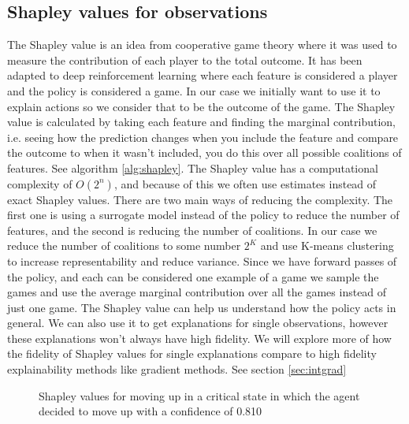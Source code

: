 \documentclass[UKenglish]{uiomasterthesis}
\begin{document}
\subsection{Shapley values for observations}
The Shapley value is an idea from cooperative game theory where it was used to measure the contribution of each player to the total outcome. It has been adapted to deep reinforcement learning where each feature is considered a player and the policy is considered a game. In our case we initially want to use it to explain actions so we consider that to be the outcome of the game. The Shapley value is calculated by taking each feature and finding the marginal contribution, i.e. seeing how the prediction changes when you include the feature and compare the outcome to when it wasn't included, you do this over all possible coalitions of features. See algorithm \ref{alg:shapley}.
The Shapley value has a computational complexity of $O(2^n)$, and because of this we often use estimates instead of exact Shapley values. There are two main ways of reducing the complexity. The first one is using a surrogate model instead of the policy to reduce the number of features, and the second is reducing the number of coalitions. In our case we reduce the number of coalitions to some number $2^K$ and use K-means clustering to increase representability and reduce variance.
Since we have forward passes of the policy, and each can be considered one example of a game we sample the games and use the average marginal contribution over all the games instead of just one game.
The Shapley value can help us understand how the policy acts in general. We can also use it to get explanations for single observations, however these explanations won't always have high fidelity. We will explore more of how the fidelity of Shapley values for single explanations compare to high fidelity explainability methods like gradient methods. See section \ref{sec:intgrad}


\begin{figure}[!ht]
	\caption{Shapley values for moving up in a critical state in which the agent decided to move up with a confidence of 0.810}
	\label{fig:shap} 
\end{figure}
\end{document}

